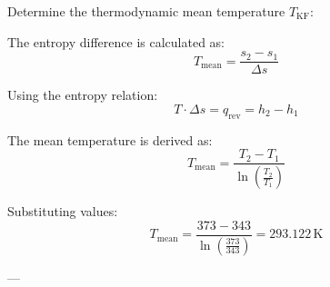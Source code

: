 Determine the thermodynamic mean temperature \( T_{\text{KF}} \):  

The entropy difference is calculated as:  
\[
T_{\text{mean}} = \frac{s_2 - s_1}{\Delta s}
\]  

Using the entropy relation:  
\[
T \cdot \Delta s = q_{\text{rev}} = h_2 - h_1
\]  

The mean temperature is derived as:  
\[
T_{\text{mean}} = \frac{T_2 - T_1}{\ln\left(\frac{T_2}{T_1}\right)}
\]  

Substituting values:  
\[
T_{\text{mean}} = \frac{373 - 343}{\ln\left(\frac{373}{343}\right)} = 293.122 \, \text{K}
\]  

---